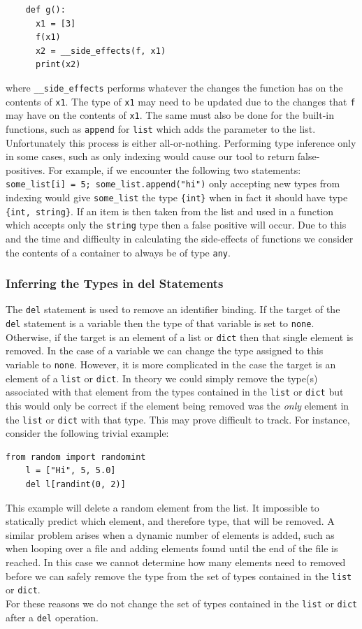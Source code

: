 \documentclass[12pt, titlepage]{article}
\begin{document}
\begin{lstlisting}
    def g():
      x1 = [3]
      f(x1)
      x2 = __side_effects(f, x1)
      print(x2)
\end{lstlisting}
where \texttt{\_\_side\_effects} performs whatever the changes the function has on the contents of \texttt{x1}. The type of \texttt{x1} may need to be updated due to the changes that \texttt{f} may have on the contents of \texttt{x1}. The same must also be done for the built-in functions, such as \texttt{append} for \texttt{list} which adds the parameter to the list. \\
\indent Unfortunately this process is either all-or-nothing. Performing type inference only in some cases, such as only indexing would cause our tool to return false-positives. For example, if we encounter the following two statements: \texttt{some\_list[i] = 5; some\_list.append("hi")} only accepting new types from indexing would give \texttt{some\_list} the type \texttt{\{int\}} when in fact it should have type \texttt{\{int, string\}}. If an item is then taken from the list and used in a function which accepts only the \texttt{string} type then a false positive will occur. Due to this and the time and difficulty in calculating the side-effects of functions we consider the contents of a container to always be of type \texttt{any}.

\subsubsection{Inferring the Types in del Statements}
The \texttt{del} statement is used to remove an identifier binding. If the target of the \texttt{del}  statement is a variable then the type of that variable is set to \texttt{none}. Otherwise, if the target is an element of a list or \texttt{dict} then that single element is removed. In the case of a variable we can change the type assigned to this variable to \texttt{none}. However, it is more complicated in the case the target is an element of a \texttt{list} or \texttt{dict}. In theory we could simply remove the type(s) associated with that element from the types contained in the \texttt{list} or \texttt{dict} but this would only be correct if the element being removed was the \textit{only} element in the \texttt{list} or \texttt{dict} with that type. This may prove difficult to track. For instance, consider the following trivial example:
\begin{lstlisting}[mathescape]
    from random import randomint
    l = ["Hi", 5, 5.0]
    del l[randint(0, 2)]
\end{lstlisting}
This example will delete a random element from the list. It impossible to statically predict which element, and therefore type, that will be removed. A similar problem arises when a dynamic number of elements is added, such as when looping over a file and adding elements found until the end of the file is reached. In this case we cannot determine how many elements need to removed before we can safely remove the type from the set of types contained in the \texttt{list} or \texttt{dict}. \\
\indent For these reasons we do not change the set of types contained in the \texttt{list} or \texttt{dict} after a \texttt{del} operation.
\end{document}

